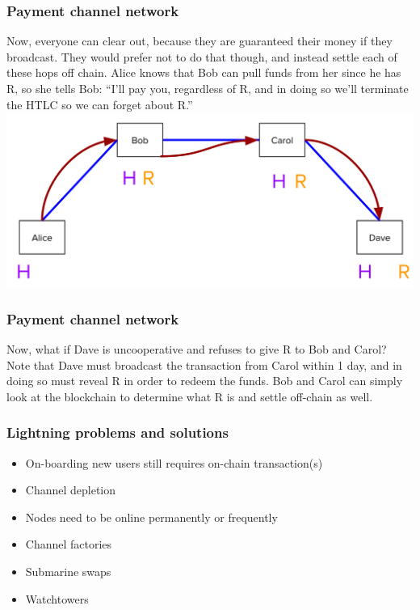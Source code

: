 \documentclass{beamer}
\begin{document}
\begin{frame}
\frametitle{Payment channel network}
Now, everyone can clear out, because they are guaranteed their money if they broadcast. They would prefer not to do that though, and instead settle each of these hops off chain. Alice knows that Bob can pull funds from her since he has R, so she tells Bob: “I’ll pay you, regardless of R, and in doing so we’ll terminate the HTLC so we can forget about R.” 
\includegraphics[scale=0.12]{images/network4.png}

\end{frame}
\begin{frame}
\frametitle{Payment channel network}
Now, what if Dave is uncooperative and refuses to give R to Bob and Carol? Note that Dave must broadcast the transaction from Carol within 1 day, and in doing so must reveal R in order to redeem the funds. Bob and Carol can simply look at the blockchain to determine what R is and settle off-chain as well.
\end{frame}

\begin{frame}
\frametitle{Lightning problems and solutions}
\begin{itemize}
\item On-boarding new users still requires on-chain transaction(s)
\item Channel depletion
\item Nodes need to be online permanently or frequently
\end{itemize}
\begin{itemize}
\item Channel factories
\item Submarine swaps
\item Watchtowers
\end{itemize}
\end{frame}
\end{document}
